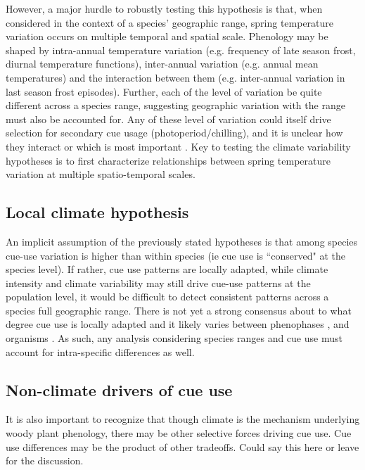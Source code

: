 \documentclass[12pt]{article}\usepackage[]{graphicx}\usepackage[]{color}
\begin{document}
However, a major hurdle to robustly testing this hypothesis is that, when considered in the context of a species' geographic range, spring temperature variation occurs on multiple temporal and spatial scale. Phenology may be shaped by intra-annual temperature variation (e.g. frequency of late season frost, diurnal temperature functions), inter-annual variation (e.g. annual mean temperatures) and the interaction between them (e.g. inter-annual variation in last season frost episodes). Further, each of the level of variation be quite different across a species range, suggesting geographic variation with the range must also be accounted for.
Any of these level of variation could itself drive selection for secondary cue usage (photoperiod/chilling), and it is unclear how they interact or which is most important \citep{Zagmajster:2014aa}. Key to testing the climate variability hypotheses is to first characterize relationships between spring temperature variation at multiple spatio-temporal scales.

\subsection{Local climate hypothesis}
An implicit assumption of the previously stated hypotheses is that among species cue-use variation is higher than within species (ie cue use is ``conserved" at the species level). If rather, cue use patterns are locally adapted, while climate intensity and climate variability may still drive cue-use patterns at the population level, it would be difficult to detect consistent patterns across a species full geographic range. There is not yet a strong consensus about to what degree cue use is locally adapted and it likely varies between phenophases \citep{}, and organisms \citep{}. As such, any analysis considering species ranges and cue use must account for intra-specific differences as well.

\subsection{Non-climate drivers of cue use}
It is also important to recognize that though climate is the mechanism underlying woody plant phenology, there may be other selective forces driving cue use. Cue use differences may be the product of other tradeoffs. Could say this here or leave for the discussion.
\end{document}
